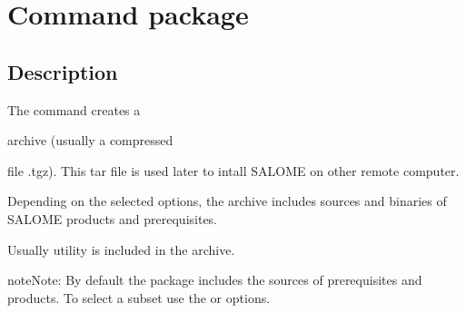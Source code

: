 \documentclass[a4paper,10pt,english]{sphinxmanual}
\begin{document}
\clearpage


\section{Command package}
\label{\detokenize{commands/package:svn}}\label{\detokenize{commands/package:command-package}}\label{\detokenize{commands/package::doc}}

\subsection{Description}
\label{\detokenize{commands/package:description}}
The  command creates a %
\begin{footnote}[14]\sphinxAtStartFootnote
{}
%
\end{footnote} archive (usually a compressed %
\begin{footnote}[15]\sphinxAtStartFootnote
{}
%
\end{footnote} file .tgz).
This tar file is used later to intall SALOME on other remote computer.

Depending on the selected options, the archive includes sources and binaries
of SALOME products and prerequisites.

Usually utility  is included in the archive.

\begin{sphinxadmonition}{note}{Note:}
By default the package includes the sources of prerequisites and products.
To select a subset use the  or  options.
\end{sphinxadmonition}
\end{document}
